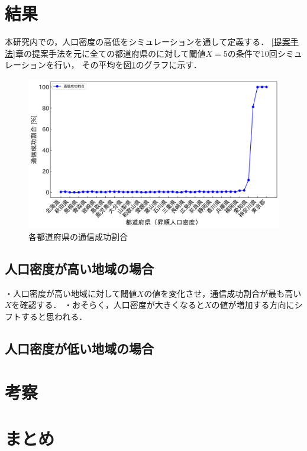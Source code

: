 \documentclass[a4paper, 11pt]{ltjsarticle}
\begin{document}
\section{結果}
本研究内での，人口密度の高低をシミュレーションを通して定義する．
\ref{提案手法}章の提案手法を元に全ての都道府県のに対して閾値$X = 5$の条件で10回シミュレーションを行い，
その平均を図\ref{figure:各都道府県の通信成功割合}のグラフに示す．

\begin{figure}[h]
  \centering
  \includegraphics[width=150mm]{通信成功率グラフ.png}
  \caption{各都道府県の通信成功割合}
  \label{figure:各都道府県の通信成功割合}
\end{figure}

\subsection{人口密度が高い地域の場合}
・人口密度が高い地域に対して閾値$X$の値を変化させ，通信成功割合が最も高い$X$を確認する．
・おそらく，人口密度が大きくなると$X$の値が増加する方向にシフトすると思われる．

\subsection{人口密度が低い地域の場合}

\clearpage
\section{考察}

\section{まとめ}

\clearpage


\end{document}
